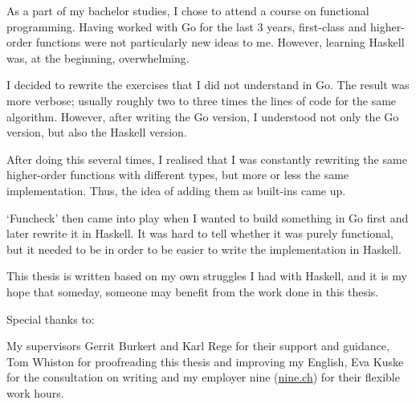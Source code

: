 
As a part of my bachelor studies, I chose to attend a course on functional programming.
Having worked with Go for the last 3 years, first-class and higher-order functions
were not particularly new ideas to me. However, learning Haskell was, at the beginning,
overwhelming.

I decided to rewrite the exercises that I did not understand in Go.
The result was more verbose; usually
roughly two to three times the lines of code for the same algorithm.
However, after writing the Go version, I understood not only the Go version,
but also the Haskell version.

After doing this several times, I realised that I was constantly rewriting
the same higher-order functions with different types, but more or less the same
implementation. Thus, the idea of adding them as built-ins came up.

`Funcheck' then came into play when I wanted to build something in Go first and
later rewrite it in Haskell. It was hard to tell whether it was purely functional,
but it needed to be in order to be easier to write the implementation in Haskell.

This thesis is written based on my own struggles I had with Haskell, and it is
my hope that someday, someone may benefit from the work done in this thesis.

Special thanks to:

My supervisors Gerrit Burkert and Karl Rege for their support and guidance,
Tom Whiston for proofreading this thesis and improving my English,
Eva Kuske for the consultation on writing and
my employer nine (\href{http://nine.ch}{nine.ch}) for their flexible work hours.
